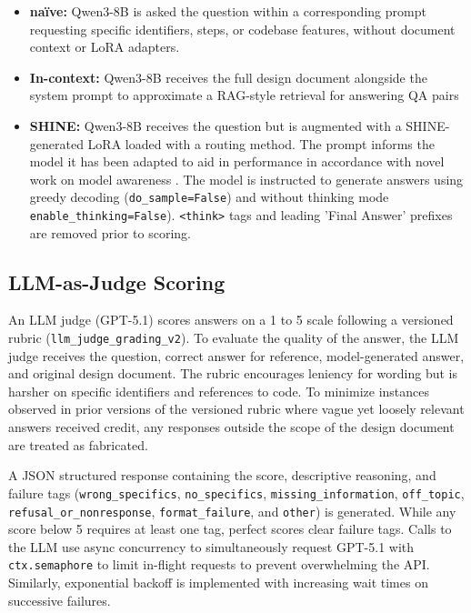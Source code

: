 \documentclass[conference,10.5pt]{IEEEtran}
\begin{document}
\begin{itemize}
    \item \textbf{naïve:} Qwen3-8B is asked the question within a corresponding prompt requesting specific identifiers, steps, or codebase features, without document context or LoRA adapters.
    \item \textbf{In-context:} Qwen3-8B receives the full design document alongside the system prompt to approximate a RAG-style retrieval for answering QA pairs
    \item \textbf{SHINE:} Qwen3-8B receives the question but is augmented with a SHINE-generated LoRA loaded with a routing method. The prompt informs the model it has been adapted to aid in performance in accordance with novel work on model awareness \cite{macar2026mechanismsintrospectiveawareness}. The model is instructed to generate answers using greedy decoding  (\texttt{do\_sample=False}) and without thinking mode \texttt{enable\_thinking=False}). \texttt{<think>} tags and leading 'Final Answer' prefixes are removed prior to scoring. 
\end{itemize}
\subsection{LLM-as-Judge Scoring}
An LLM judge (GPT-5.1) scores answers on a 1 to 5 scale following a versioned rubric (\texttt{llm\_judge\_grading\_v2}). To evaluate the quality of the answer, the LLM judge receives the question, correct answer for reference, model-generated answer, and original design document. The rubric encourages leniency for wording but is harsher on specific identifiers and references to code. To minimize instances observed in prior versions of the versioned rubric where vague yet loosely relevant answers received credit, any responses outside the scope of the design document are treated as fabricated.

A JSON structured response containing the score, descriptive reasoning, and failure tags (\texttt{wrong\_specifics}, \texttt{no\_specifics}, \texttt{missing\_information}, \texttt{off\_topic}, \texttt{refusal\_or\_nonresponse}, \texttt{format\_failure}, and \texttt{other}) is generated. While any score below 5 requires at least one tag, perfect scores clear failure tags. Calls to the LLM use  async concurrency to simultaneously request GPT-5.1 with \texttt{ctx.semaphore} to limit in-flight requests to prevent overwhelming the API. Similarly, exponential backoff is implemented with increasing wait times on successive failures.
\end{document}
